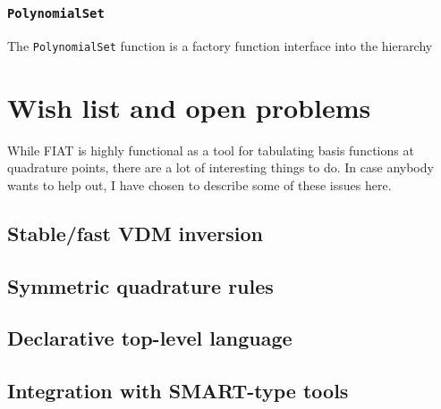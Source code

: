 \documentclass{fenicsmanual}
\begin{document}
\subsection{\texttt{PolynomialSet}}
The \texttt{PolynomialSet} function is a factory function interface into
the hierarchy 




\chapter{Wish list and open problems}
While FIAT is highly functional as a tool for tabulating basis
functions at quadrature points, there are a lot of interesting
things to do.  In case anybody wants to help out, I have
chosen to describe some of these issues here.

\section{Stable/fast VDM inversion}

\section{Symmetric quadrature rules}

\section{Declarative top-level language}

\section{Integration with SMART-type tools}
\end{document}
